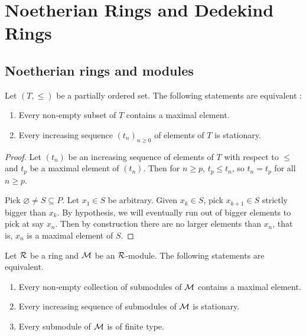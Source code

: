 \chapter{Noetherian Rings and Dedekind Rings}

\section{Noetherian rings and modules}

\begin{lemma}
  Let $(T, \leq)$ be a partially ordered set. The following statements are equivalent :
  \begin{enumerate}
    \item Every non-empty subset of $T$ contains a maximal element.
    \item Every increasing sequence $(t_n)_{n\geq 0}$ of elements of $T$ is stationary.
  \end{enumerate}
\end{lemma}
\begin{proof}
  Let $(t_n)$ be an increasing sequence of elements of $T$ with respect to $\leq$ and $t_p$ be a maximal element of $(t_n)$. Then for $n\geq p$, $t_p\leq t_n$, so $t_n = t_p$ for all $n\geq p$.

  Pick $\varnothing \neq S\subseteq P$. Let $x_1\in S$ be arbitrary. Given $x_k\in S$, pick $x_{k+1}\in S$ strictly bigger than $x_k$. By hypothesis, we will eventually run out of bigger elements to pick at say $x_n$. Then by construction there are no larger elements than $x_n$, that is, $x_n$ is a maximal element of $S$.
\end{proof}

\begin{theorem}
  Let $\mathcal{R}$ be a ring and $\mathcal{M}$ be an $\mathcal{R}$-module. The following statements are equivalent.
  \begin{enumerate}
    \item Every non-empty collection of submodules of $\mathcal{M}$ contains a maximal element.
    \item Every increasing sequence of submodules of $\mathcal{M}$ is stationary.
    \item Every submodule of $\mathcal{M}$ is of finite type.
  \end{enumerate}
\end{theorem}

